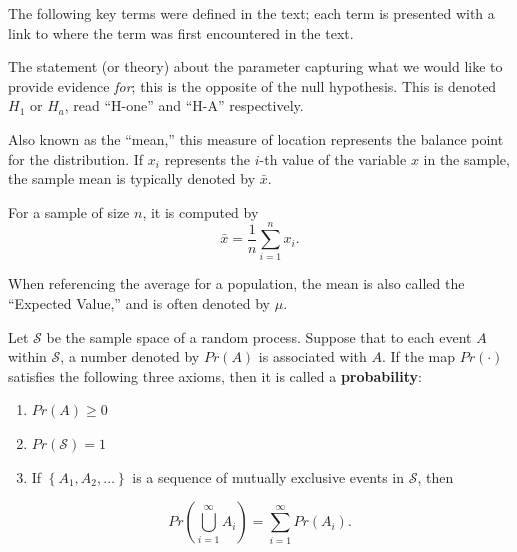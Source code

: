 \documentclass[
  letterpaper,
  DIV=11,
  numbers=noendperiod]{scrreprt}
\providecommand{\tightlist}{%
  \setlength{\itemsep}{0pt}\setlength{\parskip}{0pt}}\usepackage{longtable,booktabs,array}
\theoremstyle{definition}
\theoremstyle{definition}
\theoremstyle{plain}
\theoremstyle{remark}
\begin{document}
\providecommand{\Ell}{\mathcal{L}}
\providecommand{\indep}{\perp\negthickspace\negmedspace\perp}

The following key terms were defined in the text; each term is presented
with a link to where the term was first encountered in the text.

\begin{description}
\tightlist
\item[Alternative Hypothesis
(Definition~\ref{def-alternative-hypothesis})]
The statement (or theory) about the parameter capturing what we would
like to provide evidence \emph{for}; this is the opposite of the null
hypothesis. This is denoted \(H_1\) or \(H_a\), read ``H-one'' and
``H-A'' respectively.
\item[Average (Definition~\ref{def-average})]
Also known as the ``mean,'' this measure of location represents the
balance point for the distribution. If \(x_i\) represents the \(i\)-th
value of the variable \(x\) in the sample, the sample mean is typically
denoted by \(\bar{x}\).
\end{description}

For a sample of size \(n\), it is computed by
\[\bar{x} = \frac{1}{n}\sum_{i=1}^{n} x_i.\]

When referencing the average for a population, the mean is also called
the ``Expected Value,'' and is often denoted by \(\mu\).

\begin{description}
\tightlist
\item[Axioms of Probability (Definition~\ref{def-axioms})]
Let \(\mathcal{S}\) be the sample space of a random process. Suppose
that to each event \(A\) within \(\mathcal{S}\), a number denoted by
\(Pr(A)\) is associated with \(A\). If the map \(Pr(\cdot)\) satisfies
the following three axioms, then it is called a \textbf{probability}:
\end{description}

\begin{enumerate}
\def\labelenumi{\arabic{enumi}.}
\tightlist
\item
  \(Pr(A) \geq 0\)
\item
  \(Pr(\mathcal{S}) = 1\)
\item
  If \(\left\{A_1, A_2, \dotsc\right\}\) is a sequence of mutually
  exclusive events in \(\mathcal{S}\), then
\end{enumerate}

\[Pr\left(\bigcup_{i = 1}^{\infty} A_i\right) = \sum_{i = 1}^{\infty} Pr\left(A_i\right).\]
\end{document}
